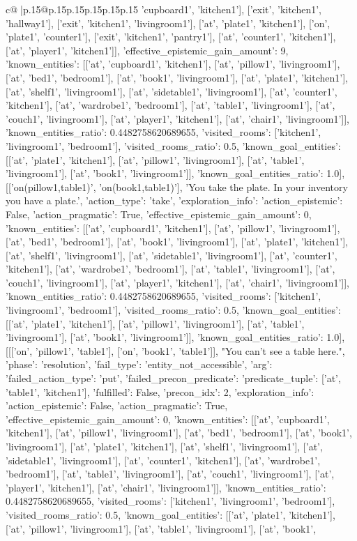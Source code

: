 \documentclass{article}
\begin{document}
{\begin{supertabular}{c@{$\;$}|p{.15\linewidth}@{}p{.15\linewidth}p{.15\linewidth}p{.15\linewidth}p{.15\linewidth}p{.15\linewidth}}
{{{'cupboard1', 'kitchen1'], ['exit', 'kitchen1', 'hallway1'], ['exit', 'kitchen1', 'livingroom1'], ['at', 'plate1', 'kitchen1'], ['on', 'plate1', 'counter1'], ['exit', 'kitchen1', 'pantry1'], ['at', 'counter1', 'kitchen1'], ['at', 'player1', 'kitchen1']], 'effective_epistemic_gain_amount': 9, 'known_entities': [['at', 'cupboard1', 'kitchen1'], ['at', 'pillow1', 'livingroom1'], ['at', 'bed1', 'bedroom1'], ['at', 'book1', 'livingroom1'], ['at', 'plate1', 'kitchen1'], ['at', 'shelf1', 'livingroom1'], ['at', 'sidetable1', 'livingroom1'], ['at', 'counter1', 'kitchen1'], ['at', 'wardrobe1', 'bedroom1'], ['at', 'table1', 'livingroom1'], ['at', 'couch1', 'livingroom1'], ['at', 'player1', 'kitchen1'], ['at', 'chair1', 'livingroom1']], 'known_entities_ratio': 0.4482758620689655, 'visited_rooms': ['kitchen1', 'livingroom1', 'bedroom1'], 'visited_rooms_ratio': 0.5, 'known_goal_entities': [['at', 'plate1', 'kitchen1'], ['at', 'pillow1', 'livingroom1'], ['at', 'table1', 'livingroom1'], ['at', 'book1', 'livingroom1']], 'known_goal_entities_ratio': 1.0}}], [['on(pillow1,table1)', 'on(book1,table1)'], 'You take the plate. In your inventory you have a plate.\n', {'action_type': 'take', 'exploration_info': {'action_epistemic': False, 'action_pragmatic': True, 'effective_epistemic_gain_amount': 0, 'known_entities': [['at', 'cupboard1', 'kitchen1'], ['at', 'pillow1', 'livingroom1'], ['at', 'bed1', 'bedroom1'], ['at', 'book1', 'livingroom1'], ['at', 'plate1', 'kitchen1'], ['at', 'shelf1', 'livingroom1'], ['at', 'sidetable1', 'livingroom1'], ['at', 'counter1', 'kitchen1'], ['at', 'wardrobe1', 'bedroom1'], ['at', 'table1', 'livingroom1'], ['at', 'couch1', 'livingroom1'], ['at', 'player1', 'kitchen1'], ['at', 'chair1', 'livingroom1']], 'known_entities_ratio': 0.4482758620689655, 'visited_rooms': ['kitchen1', 'livingroom1', 'bedroom1'], 'visited_rooms_ratio': 0.5, 'known_goal_entities': [['at', 'plate1', 'kitchen1'], ['at', 'pillow1', 'livingroom1'], ['at', 'table1', 'livingroom1'], ['at', 'book1', 'livingroom1']], 'known_goal_entities_ratio': 1.0}}], [[['on', 'pillow1', 'table1'], ['on', 'book1', 'table1']], "You can't see a table here.\n", {'phase': 'resolution', 'fail_type': 'entity_not_accessible', 'arg': {'failed_action_type': 'put', 'failed_precon_predicate': {'predicate_tuple': ['at', 'table1', 'kitchen1'], 'fulfilled': False, 'precon_idx': 2}}, 'exploration_info': {'action_epistemic': False, 'action_pragmatic': True, 'effective_epistemic_gain_amount': 0, 'known_entities': [['at', 'cupboard1', 'kitchen1'], ['at', 'pillow1', 'livingroom1'], ['at', 'bed1', 'bedroom1'], ['at', 'book1', 'livingroom1'], ['at', 'plate1', 'kitchen1'], ['at', 'shelf1', 'livingroom1'], ['at', 'sidetable1', 'livingroom1'], ['at', 'counter1', 'kitchen1'], ['at', 'wardrobe1', 'bedroom1'], ['at', 'table1', 'livingroom1'], ['at', 'couch1', 'livingroom1'], ['at', 'player1', 'kitchen1'], ['at', 'chair1', 'livingroom1']], 'known_entities_ratio': 0.4482758620689655, 'visited_rooms': ['kitchen1', 'livingroom1', 'bedroom1'], 'visited_rooms_ratio': 0.5, 'known_goal_entities': [['at', 'plate1', 'kitchen1'], ['at', 'pillow1', 'livingroom1'], ['at', 'table1', 'livingroom1'], ['at', 'book1', }}}
\end{supertabular}}
\end{document}
